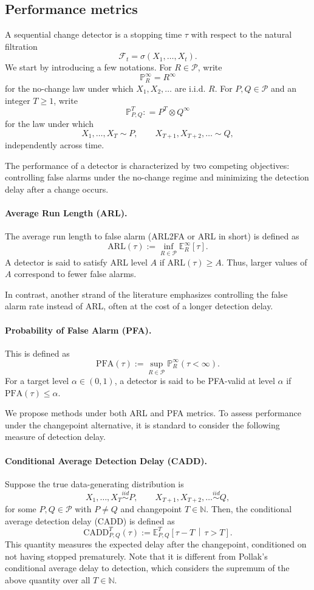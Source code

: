 \documentclass[12pt]{article}
\theoremstyle{spaced}
\theoremstyle{remark}
\newcommand{\N}{\mathbb N}
\newcommand{\calP}{\mathcal P}
\newcommand{\Pinf}[1]{\mathbb P_{#1}^{\infty}}
\newcommand{\defeq}{\mathrel{\mathop:}=}
\begin{document}
\subsection{Performance metrics}
\label{subsec:metrics}
A sequential change detector is a stopping time $\tau$ with respect to the natural filtration
\[
\mathcal F_t=\sigma(X_1,\ldots,X_t).
\]
We start by introducing a few notations.
 For $R\in\calP$, write
\[
  \Pinf{R}=R^{\infty}
\]
for the no-change law under which $X_1,X_2,\ldots$ are i.i.d. $R$.  For $P,Q\in\calP$ and an integer $T\ge 1$, write
\[
  \mathbb P_{P,Q}^{T}\defeq
  P^T\otimes Q^{\infty}
\]
for the law under which
\[
  X_1,\ldots,X_T\sim P,
  \qquad
  X_{T+1},X_{T+2},\ldots\sim Q,
\]
independently across time.  

The performance of a detector is characterized by two competing objectives: controlling false alarms under the no-change regime and minimizing the detection delay after a change occurs.

\paragraph{Average Run Length (ARL).}
The average run length to false alarm (ARL2FA or ARL in short) is defined as
\[
\mathrm{ARL}(\tau)
:=
\inf_{R\in\calP}
\mathbb E_R^\infty[\tau].
\]
A detector is said to satisfy ARL level $A$ if
$\mathrm{ARL}(\tau)\ge A.$
Thus, larger values of $A$ correspond to fewer false alarms.

In contrast, another strand of the literature emphasizes controlling the false alarm rate instead of ARL, often at the cost of a longer detection delay.

\paragraph{Probability of False Alarm (PFA).} This is defined as
\[
\mathrm{PFA}(\tau)
:=
\sup_{R\in\calP}
\mathbb P_R^\infty(\tau<\infty).
\]
For a target level $\alpha\in(0,1)$, a detector is said to be PFA-valid at level $\alpha$ if
$\mathrm{PFA}(\tau)\le \alpha.$

We propose methods under both ARL and PFA metrics. To assess performance under the changepoint alternative, it is standard to consider the following measure of detection delay.

\paragraph{Conditional Average Detection Delay (CADD).}
Suppose the true data-generating distribution is
\[
X_1,\ldots,X_T\stackrel{iid}{\sim}P,
\qquad
X_{T+1},X_{T+2},\ldots
\stackrel{iid}{\sim}Q,
\]
for some $P,Q\in\calP$ with $P\neq Q$ and changepoint $T\in\mathbb N$.
Then, the conditional average detection delay (CADD) is defined as
\[
\mathrm{CADD}_{P,Q}^{T}(\tau)
:=
\mathbb E_{P,Q}^{T}
\left[
\tau-T
\,\middle|\,
\tau>T
\right].
\]
This quantity measures the expected delay after the changepoint, conditioned on not having stopped prematurely.
Note that it is different from Pollak’s conditional average delay to detection, which considers the supremum of the above quantity over all $T\in\N$.
\end{document}
